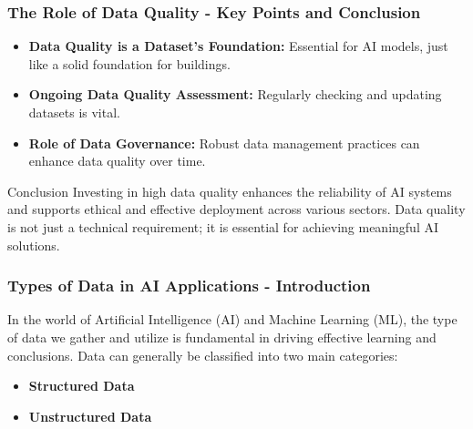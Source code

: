 \documentclass[aspectratio=169]{beamer}
\begin{document}
\begin{frame}[fragile]
    \frametitle{The Role of Data Quality - Key Points and Conclusion}
    \begin{itemize}
        \item \textbf{Data Quality is a Dataset’s Foundation:} Essential for AI models, just like a solid foundation for buildings.
        
        \item \textbf{Ongoing Data Quality Assessment:} Regularly checking and updating datasets is vital.
        
        \item \textbf{Role of Data Governance:} Robust data management practices can enhance data quality over time.
    \end{itemize}

    \begin{block}{Conclusion}
        Investing in high data quality enhances the reliability of AI systems and supports ethical and effective deployment across various sectors. Data quality is not just a technical requirement; it is essential for achieving meaningful AI solutions.
    \end{block}
\end{frame}

\begin{frame}[fragile]
    \frametitle{Types of Data in AI Applications - Introduction}
    In the world of Artificial Intelligence (AI) and Machine Learning (ML), the type of data we gather and utilize is fundamental in driving effective learning and conclusions. Data can generally be classified into two main categories:
    \begin{itemize}
        \item \textbf{Structured Data}
        \item \textbf{Unstructured Data}
    \end{itemize}
\end{frame}
\end{document}
